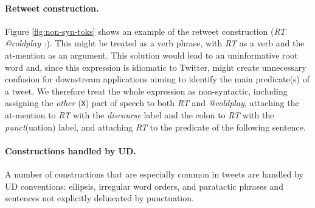 \documentclass[11pt,a4paper]{article}
\begin{document}
\paragraph{Retweet construction.} Figure \ref{fig:non-syn-toks} shows
an example of the retweet construction (\emph{RT @coldplay :}).  This
might be treated as a verb phrase, with \emph{RT} as a verb and the
at-mention as an argument.
  This solution would lead to an uninformative root
word and, since this expression is idiomatic to Twitter, might create
unnecessary confusion for downstream applications aiming to identify
the main predicate(s) of a tweet.  We therefore treat the whole
expression as non-syntactic, including assigning the \emph{other}
(\texttt{X}) part of speech to both \emph{RT} and \emph{@coldplay},
attaching the at-mention to \emph{RT} with the \emph{discourse}
label and the colon to \emph{RT} with the \emph{punct}(uation) label,
and attaching \emph{RT} to the predicate of the following sentence.



\paragraph{Constructions handled by UD.}  A number of constructions
that are especially common in tweets are handled by UD
conventions: ellipsis, irregular word orders, and paratactic phrases
and sentences 
not explicitly delineated by punctuation.
	
\end{document}
